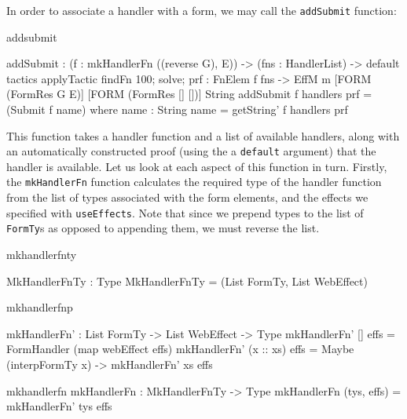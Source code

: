 \noindent
In order to associate a handler with a form, we may call the \texttt{addSubmit}
function:

\begin{SaveVerbatim}{addsubmit}

addSubmit : (f :  mkHandlerFn ((reverse G), E)) ->
            (fns : HandlerList) ->
            {default tactics 
              { applyTactic findFn 100; solve; }
              prf : FnElem f fns} ->
            EffM m [FORM (FormRes G E)]
                   [FORM (FormRes [] [])] 
                   String
addSubmit f handlers {prf} = (Submit f name)
    where name : String
          name = getString' f handlers prf          

\end{SaveVerbatim}

\noindent
This function takes a handler function and a list of available handlers, along with
an automatically constructed proof (using the a \texttt{default} argument) that the
handler is available.
Let us look at each aspect of this function in turn. Firstly, the
\texttt{mkHandlerFn} function calculates the required type of the handler
function from the list of types associated with the form elements, and the
effects we specified with \texttt{useEffects}. Note that since we prepend types
to the list of \texttt{FormTy}s as opposed to appending them, we must reverse
the list.

\begin{SaveVerbatim}{mkhandlerfnty}

MkHandlerFnTy : Type
MkHandlerFnTy = (List FormTy, List WebEffect)

\end{SaveVerbatim}

\begin{SaveVerbatim}{mkhandlerfnp}

mkHandlerFn' : List FormTy -> List WebEffect -> Type
mkHandlerFn' [] effs = FormHandler (map webEffect effs) 
mkHandlerFn' (x :: xs) effs = Maybe (interpFormTy x) -> 
                              mkHandlerFn' xs effs 
\end{SaveVerbatim}

\begin{SaveVerbatim}{mkhandlerfn}
mkHandlerFn : MkHandlerFnTy -> Type 
mkHandlerFn (tys, effs) = mkHandlerFn' tys effs 

\end{SaveVerbatim}



